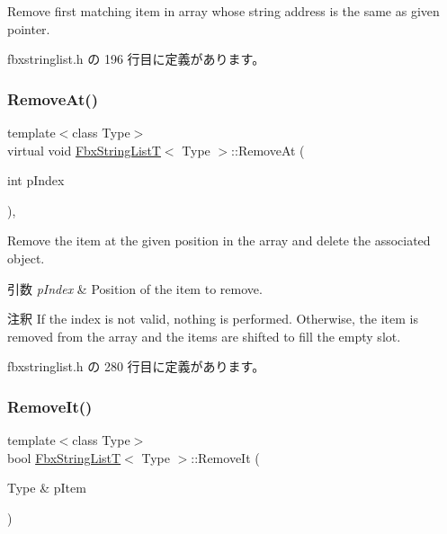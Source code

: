 Remove first matching item in array whose string address is the same as given pointer. 



 fbxstringlist.\+h の 196 行目に定義があります。

\mbox{\label{class_fbx_string_list_t_afef2030e06b13d23e998cbc6ea6ff9a3}} 
\subsubsection{\texorpdfstring{Remove\+At()}{RemoveAt()}}
{\footnotesize\ttfamily template$<$class Type$>$ \\
virtual void \hyperlink{class_fbx_string_list_t}{Fbx\+String\+ListT}$<$ Type $>$\+::Remove\+At (\begin{DoxyParamCaption}\item[{int}]{p\+Index }\end{DoxyParamCaption})\hspace{0.3cm}{\ttfamily [inline]}, {\ttfamily [virtual]}}

Remove the item at the given position in the array and delete the associated object. 
\begin{DoxyParams}{引数}
{\em p\+Index} & Position of the item to remove. \\
\hline
\end{DoxyParams}
\begin{DoxyRemark}{注釈}
If the index is not valid, nothing is performed. Otherwise, the item is removed from the array and the items are shifted to fill the empty slot. 
\end{DoxyRemark}


 fbxstringlist.\+h の 280 行目に定義があります。

\mbox{\label{class_fbx_string_list_t_a810bce1e1440e69c6e44a657cfe5d2a3}} 
\subsubsection{\texorpdfstring{Remove\+It()}{RemoveIt()}}
{\footnotesize\ttfamily template$<$class Type$>$ \\
bool \hyperlink{class_fbx_string_list_t}{Fbx\+String\+ListT}$<$ Type $>$\+::Remove\+It (\begin{DoxyParamCaption}\item[{Type \&}]{p\+Item }\end{DoxyParamCaption})\hspace{0.3cm}{\ttfamily [inline]}}



